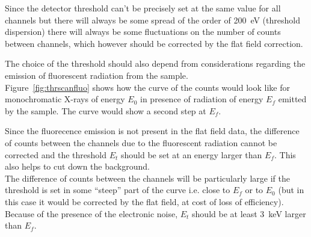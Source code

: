 Since the detector threshold can't be precisely set at the same value for all channels but there will always be some spread of the order of 200~eV (threshold dispersion) there will always be some fluctuations on the number of counts between channels, which however should be corrected by the flat field correction.

The choice of the threshold should also depend from  considerations regarding the emission of fluorescent radiation from the sample.\\
Figure~\ref{fig:thrscanfluo} shows  how the curve of the counts would look like for monochromatic X-rays of energy $E_0$ in presence of radiation of energy $E_f$ emitted by the sample. The curve would show a second step at $E_f$. 

Since the fluorecence emission is not present in the flat field data, the difference of counts between the channels due to the fluorescent radiation cannot be corrected and the threshold $E_t$ should be set at an energy larger than $E_f$. This also helps to cut down the background.\\
The difference of counts between the channels will be particularly large if the threshold is set in some ``steep'' part of the curve i.e. close to $E_f$ or to $E_0$ (but in this case it would be corrected by the flat field, at cost of loss of efficiency).
Because of the presence of the electronic noise, $E_t$ should be at least 3~keV larger than $E_f$.

